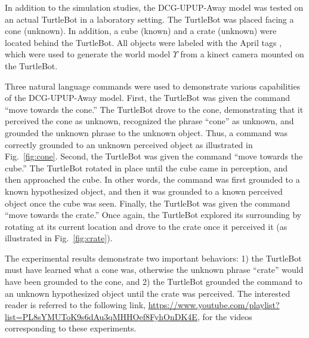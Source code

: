 In addition to the simulation studies, the DCG-UPUP-Away model was tested on an actual TurtleBot in a laboratory setting.
The TurtleBot was placed facing %
a cone (unknown).
In addition, a cube (known) and a crate (unknown) were located behind the TurtleBot.
All objects were labeled with the April tags \cite{olson2011}, which were used to generate the world model $\Upsilon$ from a kinect camera mounted on the TurtleBot.

Three natural language commands were used to demonstrate various capabilities of the DCG-UPUP-Away model.
First, the TurtleBot was given the command ``move towards the cone.''
The TurtleBot drove to the cone, demonstrating that it perceived the cone as unknown, recognized the phrase ``cone'' as unknown, and grounded the unknown phrase to the unknown object.
Thus, a command was correctly grounded to an unknown perceived object as illustrated in Fig.~\ref{fig:cone}.
Second, the TurtleBot was given the command ``move towards the cube.''
The TurtleBot rotated in place until the cube came in perception, and then approached the cube.
In other words, the command was first grounded to a known hypothesized object, and then it was grounded to a known perceived object once the cube was seen. 
Finally, the TurtleBot was given the command ``move towards the crate.''
Once again, the TurtleBot explored its surrounding by rotating at its current location and drove to the crate once it perceived it (as illustrated in Fig.~\ref{fig:crate}). %

The experimental results demonstrate two important behaviors: 1) the TurtleBot must have learned what a cone was, otherwise the unknown phrase ``crate'' would have been grounded to the cone, and 2) the TurtleBot grounded the command to an unknown hypothesized object until the crate was perceived. The interested reader is referred to the following link, \url{https://www.youtube.com/playlist?list=PL8sYMUToK9s6dAu3qMHHOef8FyhOnDK4E}, for the videos corresponding to these experiments.

